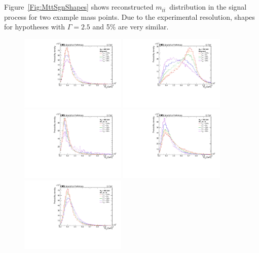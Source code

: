 Figure~\ref{Fig:MttSgnShapes} shows reconstructed $m_{t\bar t}$~distribution in the signal process for two example mass points.
Due to the experimental resolution, shapes for hypotheses with $\Gamma = 2.5$ and 5\% are very similar.

\begin{figure}
  \centering
  \includegraphics[width=0.45\textwidth]{fig/chapt5/sgnShapes/res/mtt_m400.pdf}
  \includegraphics[width=0.45\textwidth]{fig/chapt5/sgnShapes/res/mtt_m750.pdf} \\
  \includegraphics[width=0.45\textwidth]{fig/chapt5/sgnShapes/int/mtt_m400_pos.pdf}
  \includegraphics[width=0.45\textwidth]{fig/chapt5/sgnShapes/int/mtt_m750_pos.pdf} \\
  \includegraphics[width=0.45\textwidth]{fig/chapt5/sgnShapes/int/mtt_m400_neg.pdf}

\end{figure}
